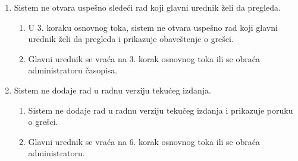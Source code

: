 \documentclass[a4paper]{article}
\begin{document}
\begin{itemize}
\begin{enumerate}
            \item Sistem ne otvara uspešno sledeći rad koji glavni urednik želi da pregleda.
                \begin{enumerate}
                    \item U 3. koraku osnovnog toka, sistem ne otvara uspešno rad koji glavni urednik želi da pregleda i prikazuje obaveštenje o grešci.
                    \item Glavni urednik se vraća na 3. korak osnovnog toka ili se obraća administratoru časopisa.
                \end{enumerate}
            \item Sistem ne dodaje rad u radnu verziju tekućeg izdanja.
            \begin{enumerate}
                \item Sistem ne dodaje rad u radnu verziju tekučeg izdanja i prikazuje poruku o grešci.
                \item Glavni urednik se vraća na 6. korak osnovnog toka ili se obraća administratoru.
            \end{enumerate}
        \end{enumerate}
\end{itemize}

\newpage
\end{document}
